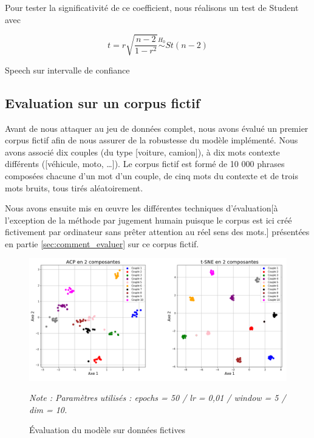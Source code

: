 \documentclass[11pt,french,french]{article}
\begin{document}
Pour tester la significativité de ce coefficient, nous réalisons un test
de Student avec

\[t = r\sqrt{\frac{n-2}{1-r^2}}\overset{H_0}{\sim} St(n-2)\]

\colorbox{BurntOrange}{Speech sur intervalle de confiance}

\hypertarget{evaluation-sur-un-corpus-fictif}{%
\subsection{Evaluation sur un corpus
fictif}\label{evaluation-sur-un-corpus-fictif}}

\label{sec:corpus_fictif}

Avant de nous attaquer au jeu de données complet, nous avons évalué un
premier corpus fictif afin de nous assurer de la robustesse du modèle
implémenté. Nous avons associé dix couples (du type {[}voiture,
camion{]}), à dix mots contexte différents ({[}véhicule, moto,
\dots{]}). Le corpus fictif est formé de 10 000 phrases composées
chacune d'un mot d'un couple, de cinq mots du contexte et de trois mots
bruits, tous tirés aléatoirement.

Nous avons ensuite mis en œuvre les différentes techniques
d'évaluation{[}à l'exception de la méthode par \og jugement humain
\fg puisque le corpus est ici créé fictivement par ordinateur sans
prêter attention au réel sens des mots.{]} présentées en partie
\ref{sec:comment_evaluer} sur ce corpus fictif.

\begin{figure}[!ht]
\begin{center}
\includegraphics[width=1\textwidth]{img/figures.png}
\captionsetup{margin=0cm,format=hang,justification=justified}
\caption{Évaluation du modèle sur données fictives}\label{fig:figure_evaluation}
\end{center}
\vspace{-0.3cm}
\footnotesize
\emph{Note : Paramètres utilisés : epochs = 50 / lr = 0,01 / window = 5 / dim = 10.}
\end{figure}
\end{document}
